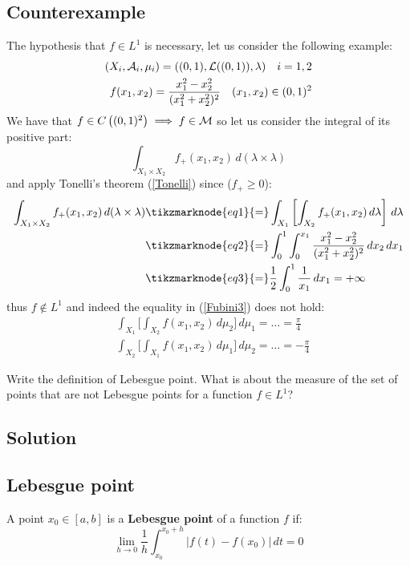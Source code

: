 \subsection{Counterexample}
The hypothesis that $f \in L^1$ is necessary, let us consider the following example: \\
\begin{align*}
    (X_i, \mathcal{A}_i, \mu_i) = ( (0,1), \mathcal{L}((0,1)), \lambda) \quad i=1,2 \\
    f(x_1, x_2) = \frac{x_1^2 - x_2^2}{(x_1^2+x_2^2)^2} \quad (x_1,x_2) \in (0,1)^2
\end{align*}
We have that $f \in C\left( (0,1)^2 \right) \implies f \in \mathcal{M}$ so let us consider the integral of its positive part:
\[
    \int_{X_1 \times X_2} f_+ (x_1, x_2) \, d(\lambda \times \lambda)    
\]
\newpage %
and apply Tonelli's theorem (\ref{Tonelli}) since ($f_+\geq 0$):
\begin{align*}
    \int_{X_1 \times X_2} f_+ (x_1, x_2) \, d(\lambda \times \lambda) & \tikzmarknode{eq1}{=} \int_{X_1} \left[ \int_{X_2} f_+(x_1,x_2) \, d\lambda \right] \, d\lambda \\
    & \tikzmarknode{eq2}{=} \int_0^1 \int_0^{x_1} \frac{x_1^2 - x_2^2}{(x_1^2+x_2^2)^2} \, dx_2 \, dx_1 \\
    & \tikzmarknode{eq3}{=} \frac{1}{2} \int_0^1 \frac{1}{x_1} \, dx_1 = + \infty
\end{align*} 
thus $f\notin L^1$ and indeed the equality in (\ref{Fubini3}) does not hold:
\begin{align*}
    & \int_{X_1} \biggl[ \int_{X_2} f(x_1,x_2) \, d\mu_2 \biggr] \, d\mu_1 = \dots = \frac{\pi}{4} \\
    & \int_{X_2}  \biggl[ \int_{X_1} f(x_1,x_2) \, d\mu_1 \biggr] \, d\mu_2 = \dots = -\frac{\pi}{4}
\end{align*}


\question
Write the definition of Lebesgue point. What is about the measure of the set of points that are not Lebesgue points for a function $f \in L^1$?

\subsection*{Solution}

\subsection{Lebesgue point}
A point $x_0 \in [a,b]$ is a \textbf{Lebesgue point} of a function $f$ if:
\[
    \lim_{h\to0} \frac{1}{h} \int_{x_0}^{x_0+h} |f(t)-f(x_0)| \, dt = 0
\]

